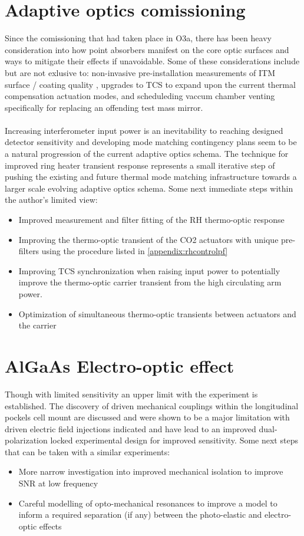 
\section{Adaptive optics comissioning}
Since the comissioning that had taken place in O3a, there has been heavy consideration into how point absorbers manifest on the core optic surfaces and ways to mitigate their effects if unavoidable. Some of these considerations include but are not exlusive to: non-invasive pre-installation measurements of ITM surface / coating quality \cite{dcc:paNSFupdate2022}, upgrades to TCS to expand upon the current thermal compensation actuation modes, and scheduleding vaccum chamber venting specifically for replacing an offending test mass mirror. 
\\
\\
Increasing interferometer input power is an inevitability to reaching designed detector sensitivity and developing mode matching contingency plans seem to be a natural progression of the current adaptive optics schema. The technique for improved ring heater transient response represents a small iterative step of pushing the existing and future thermal mode matching infrastructure towards a larger scale evolving adaptive optics schema. Some next immediate steps within the author's limited view:

\begin{itemize}
	\item Improved measurement and filter fitting of the RH thermo-optic response
	\item Improving the thermo-optic transient of the CO2 actuators with unique pre-filters using the procedure listed in \autoref{appendix:rhcontrolpf} 
	\item Improving TCS synchronization when raising input power to potentially improve the thermo-optic carrier transient from the high circulating arm power.
	\item Optimization of simultaneous thermo-optic transients between actuators and the carrier 
\end{itemize}

\section{AlGaAs Electro-optic effect}
Though with limited sensitivity an upper limit with the experiment is established. The discovery of driven mechanical couplings within the longitudinal pockels cell mount are discussed and were shown to be a major limitation with driven electric field injections indicated and have lead to an improved dual-polarization locked experimental design for improved sensitivity. Some next steps that can be taken with a similar experiments:

\begin{itemize}
	\item More narrow investigation into improved mechanical isolation to improve SNR at low frequency
	\item Careful modelling of opto-mechanical resonances to improve a model to inform a required separation (if any) between the photo-elastic and electro-optic effects 
\end{itemize}
